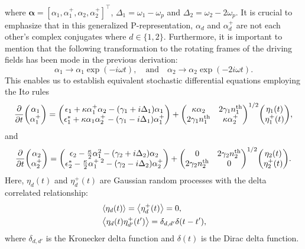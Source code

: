 \documentclass[fleqn,11pt]{wlscirep}
\begin{document}
where $\boldsymbol{\alpha} = [{\alpha}_1,{\alpha}_1^{+},{\alpha}_2,{\alpha}_2^{+}]^{\intercal}$, $\Delta_1 = \omega_1 - \omega_p$ and $\Delta_2 = \omega_2 - 2\omega_p$. It is crucial to emphasize that in this generalized P-representation, $\alpha_{d}$ and $\alpha^+_{d}$ are not each other's complex conjugates where $d \in \{1,2\}$. Furthermore, it is important to mention that the following transformation to the rotating frames of the driving fields has been mode in the previous derivation:
\begin{equation}
	\alpha_1 \rightarrow \alpha_1\exp(-i\omega t), \quad \text{and} \quad
	\alpha_2 \rightarrow \alpha_2\exp(-2i\omega t).
\end{equation}
This enables us to establish equivalent stochastic differential equations employing the It$\hat{o}$ rules
\begin{equation}\label{eq_lan_1}
	\pdv{t}\mqty(\alpha_1 \\ \alpha_1^+) =
	\mqty(\epsilon_1 + \kappa\alpha_1^+\alpha_2 - (\gamma_1 + i\Delta_1)\alpha_1 \\
	\epsilon_1^* + \kappa\alpha_1\alpha_2^+ - (\gamma_1 - i\Delta_1)\alpha_1^+ ) +
	\mqty(\kappa\alpha_2 & 2\gamma_1n^{\text{th}}_1 \\
	 2\gamma_1n^{\text{th}}_1 & \kappa\alpha_2^+)^{1/2}
	\mqty(\eta_1(t) \\ \eta_1^+(t)),
\end{equation}
and 
\begin{equation}\label{eq_lan_2}
	\pdv{t}\mqty(\alpha_2 \\ \alpha_2^+) =
	\mqty(\epsilon_2 -\frac{\kappa}{2}\alpha_1^2 - (\gamma_2 + i\Delta_2)\alpha_2 \\
	\epsilon_2^* -\frac{\kappa}{2}\alpha_1^{+\;2} - (\gamma_2 - i\Delta_2)\alpha_2^+ ) +
	\mqty(0 & 2\gamma_2n^{\text{th}}_2 \\
	 2\gamma_2n^{\text{th}}_2 & 0)^{1/2}
	\mqty(\eta_2(t) \\ \eta_2^+(t)).
\end{equation}
Here, $\eta_d(t)$ and $\eta_d^+(t)$ are Gaussian random processes with the delta correlated relationship:
\begin{equation}
	\begin{aligned}
		&\expval{\eta_d(t)} = \expval{\eta_d^+(t)} = 0, \\
		&\expval{\eta_d(t)\eta_{d'}^+(t')} = \delta_{d,d'}\delta(t-t'),
	\end{aligned}
\end{equation}
where $\delta_{d,d'}$ is the Kronecker delta function and $\delta(t)$ is the Dirac delta function. 
\end{document}
